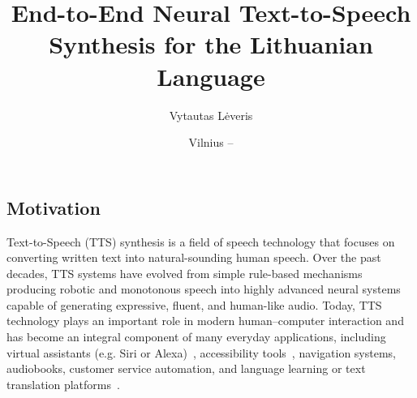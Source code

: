 \documentclass[
         english, %
    monochrome, %
]{VUMIFSEMasterThesis}
\title{End-to-End Neural Text-to-Speech Synthesis for the Lithuanian Language}
\author{Vytautas Lėveris}
\date{Vilnius – \the\year}
\begin{document}
\maketitle






\tableofcontents


\subsection*{Motivation}

Text-to-Speech (TTS) synthesis is a field of speech technology that focuses on converting written text into natural-sounding human speech. Over the past decades, TTS systems have evolved from simple rule-based mechanisms producing robotic and monotonous speech into highly advanced neural systems capable of generating expressive, fluent, and human-like audio. Today, TTS technology plays an important role in modern human–computer interaction and has become an integral component of many everyday applications, including virtual assistants (e.g. Siri or Alexa)~\cite{hoy2018alexa}, accessibility tools~\cite{teixeira2009speech, sharma2012speech}, navigation systems, audiobooks, customer service automation, and language learning or text translation platforms~\cite{kavitha2024enhancing}.
\end{document}
